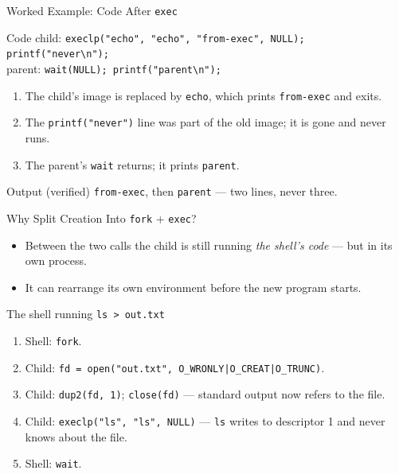 \documentclass[aspectratio=169]{beamer}
\begin{document}
\begin{frame}{Worked Example: Code After \texttt{exec}}
  \begin{block}{Code}
    child: \texttt{execlp("echo", "echo", "from-exec", NULL);
    printf("never\textbackslash n");}\\
    parent: \texttt{wait(NULL); printf("parent\textbackslash n");}
  \end{block}
  \begin{enumerate}
    \item The child's image is replaced by \texttt{echo}, which prints
      \texttt{from-exec} and exits.
    \item The \texttt{printf("never")} line was part of the old image; it is
      gone and never runs.
    \item The parent's \texttt{wait} returns; it prints \texttt{parent}.
  \end{enumerate}
  \vspace{0.1cm}
  \begin{exampleblock}{Output (verified)}
    \texttt{from-exec}, then \texttt{parent} --- two lines, never three.
  \end{exampleblock}
\end{frame}

\begin{frame}{Why Split Creation Into \texttt{fork} + \texttt{exec}?}
  \begin{itemize}
    \item Between the two calls the child is still running \emph{the shell's
      code} --- but in its own process.
    \item It can rearrange its own environment before the new program starts.
  \end{itemize}
  \vspace{0.1cm}
  \begin{exampleblock}{The shell running \texttt{ls > out.txt}}
    \begin{enumerate}
      \item Shell: \texttt{fork}.
      \item Child: \texttt{fd = open("out.txt", O\_WRONLY|O\_CREAT|O\_TRUNC)}.
      \item Child: \texttt{dup2(fd, 1)}; \texttt{close(fd)} --- standard
        output now refers to the file.
      \item Child: \texttt{execlp("ls", "ls", NULL)} --- \texttt{ls} writes
        to descriptor 1 and never knows about the file.
      \item Shell: \texttt{wait}.
    \end{enumerate}
  \end{exampleblock}
\end{frame}
\end{document}
